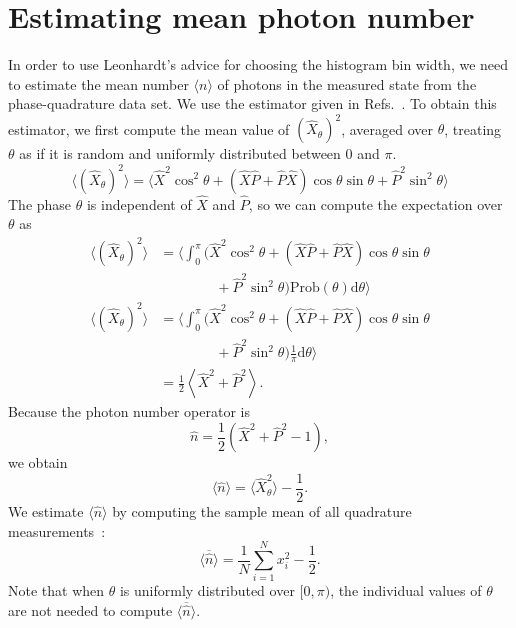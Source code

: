 \documentclass[
reprint,
superscriptaddress,
showpacs,
amsmath,
amssymb,
aps,
pra,
longbibliography
]{revtex4-1}
\begin{document}
\section{Estimating mean photon number}
\label{sec-photon-estimation}
In order to use Leonhardt's advice for choosing the histogram bin
width, we need to estimate the mean number $\langle n \rangle$ of
photons in the measured state from the phase-quadrature data
set. We use the estimator given in Refs.~\cite{Hradil2,Munroe1996}.  
To obtain this estimator, we first compute the mean value of
$(\hat{X}_{\theta})^{2}$, averaged over $\theta$, treating $\theta$ as
if it is random and uniformly distributed between $0$ and $\pi$.
\begin{equation}
  \langle (\hat{X}_{\theta})^{2} \rangle = \langle \hat{X}^{2}\cos^{2}\theta + (\hat{X}\hat{P}+\hat{P}\hat{X})\cos\theta\sin\theta + \hat{P}^{2}\sin^{2}\theta \rangle
\end{equation}
The phase $\theta$ is independent of $\hat{X}$ and $\hat{P}$, so we
can compute the expectation over $\theta$ as
\begin{align}
  \langle (\hat{X}_{\theta})^{2} \rangle &= \Big\langle \int_{0}^{\pi} (\hat{X}^{2}\cos^{2}\theta + (\hat{X}\hat{P}+\hat{P}\hat{X})\cos\theta\sin\theta \nonumber \\
                                         & \qquad \qquad + \hat{P}^{2}\sin^{2}\theta) \mathrm{Prob}(\theta) \mathrm{d}\theta \Big\rangle \\
  \langle (\hat{X}_{\theta})^{2} \rangle &= \Big\langle \int_{0}^{\pi} (\hat{X}^{2}\cos^{2}\theta + (\hat{X}\hat{P}+\hat{P}\hat{X})\cos\theta\sin\theta \nonumber \\
                                         & \qquad \qquad + \hat{P}^{2}\sin^{2}\theta) \frac{1}{\pi} \mathrm{d}\theta \Big\rangle \\
                                         &= \frac{1}{2}\left\langle \hat{X}^{2} + \hat{P}^{2} \right\rangle.
\end{align}
Because the photon number operator is
\begin{equation}
  \hat{n} = \frac{1}{2}\left(\hat{X}^{2}+\hat{P}^{2}-1\right),
\end{equation}
we obtain
\begin{equation}
  \langle\hat{n}\rangle = \langle \hat{X}_{\theta}^{2}\rangle-\frac{1}{2}. 
\end{equation}
We estimate $\langle \hat{n} \rangle$ by computing the sample
mean of all quadrature measurements~\cite{Hradil2,Munroe1996}:
\begin{equation}
  \overline{\langle \hat{n} \rangle} = \frac{1}{N} \sum_{i=1}^{N}x_{i}^{2} - \frac{1}{2}.
  \label{eq-photon-estimation}
\end{equation}
Note that when $\theta$ is uniformly distributed over $[0,\pi)$, the
individual values of $\theta$ are not needed to compute
$\overline{\langle \hat{n} \rangle}$.
\end{document}
